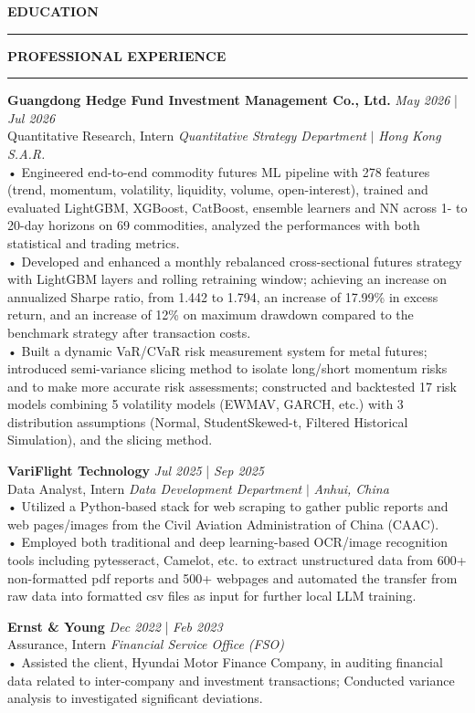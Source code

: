 \documentclass{resume} %
\renewcommand{\sectionskip}{\vspace{0.10cm}}        %
\renewcommand{\sectionlineskip}{\vspace{0.10cm}}
\renewenvironment{rSection}[1]{
\sectionskip
\textcolor{UC San Diego Blue}{\textbf{\large\bfseries\MakeUppercase{#1}}}

\sectionlineskip
\hrule
\begin{list}{}{
\setlength{\leftmargin}{0em}
}
\item[]
}{
\end{list}
}
\begin{document}
\begin{rSection}{EDUCATION}
\begin{rSection}{PROFESSIONAL EXPERIENCE}
\noindent
\textbf{Guangdong Hedge Fund Investment Management Co., Ltd.} \hfill {\em May 2026} | {\em Jul 2026} \\
Quantitative Research, Intern \hfill \textit{Quantitative Strategy Department} $|$ \textit{Hong Kong S.A.R.} \\[4pt]
• Engineered end-to-end commodity futures ML pipeline with 278 features (trend, momentum, volatility, liquidity, volume, open-interest), trained and evaluated LightGBM, XGBoost, CatBoost, ensemble learners and NN across 1- to 20-day horizons on 69 commodities, analyzed the performances with both statistical and trading metrics.\\[1.5pt]    
• Developed and enhanced a monthly rebalanced cross-sectional futures strategy with LightGBM layers and rolling retraining window; achieving an increase on annualized Sharpe ratio, from 1.442 to 1.794, an increase of 17.99\% in excess return, and an increase of 12\% on maximum drawdown compared to the benchmark strategy after transaction costs.\\[1.5pt]
• Built a dynamic VaR/CVaR risk measurement system for metal futures; introduced semi-variance slicing method to isolate long/short momentum risks and to make more accurate risk assessments; constructed and backtested 17 risk models combining 5 volatility models (EWMAV, GARCH, etc.) with 3 distribution assumptions (Normal, Student\/Skewed-t, Filtered Historical Simulation), and the slicing method.

\textbf{VariFlight Technology} \hfill {\em Jul 2025} | {\em Sep 2025} \\
Data Analyst, Intern \hfill \textit{Data Development Department} $|$ \textit{Anhui, China} \\[4pt]
• Utilized a Python-based stack for web scraping to gather public reports and web pages/images from the Civil Aviation Administration of China (CAAC). \\[1.5pt]
• Employed both traditional and deep learning-based OCR/image recognition tools including pytesseract, Camelot, etc. to extract unstructured data from 600+ non-formatted pdf reports and 500+ webpages and automated the transfer from raw data into formatted csv files as input for further local LLM training. 

\textbf{Ernst \& Young} \hfill {\em Dec 2022} | {\em Feb 2023} \\
Assurance, Intern \hfill \textit{Financial Service Office (FSO)}\\[4pt]
• Assisted the client, Hyundai Motor Finance Company, in auditing financial data related to inter-company and investment transactions; Conducted variance analysis to investigated significant deviations.
\end{rSection}

\end{rSection}
\end{document}
